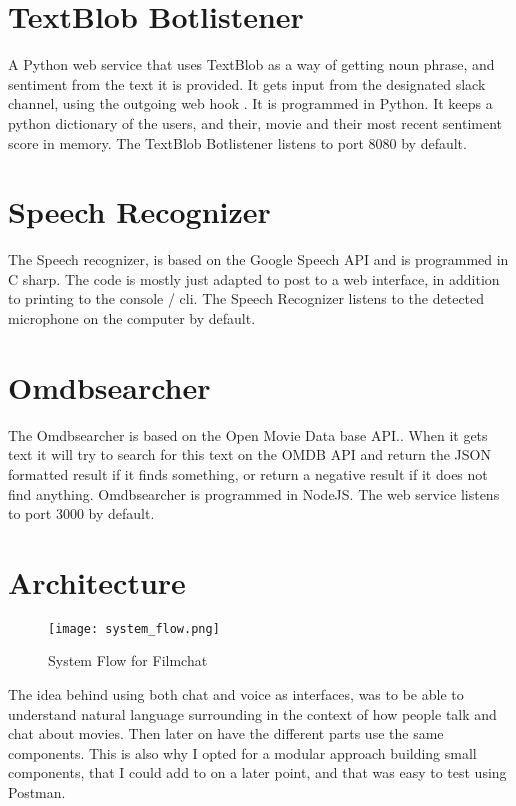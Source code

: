 \documentclass[11pt,fleqn]{book} %
\begin{document}
\section{TextBlob Botlistener}
A Python web service that uses TextBlob\cite{TextBlobTutorial:Documentation} as a way of getting noun phrase\cite{WikipediaNounPhrase}, and sentiment\cite{WikipediaSentimentAnalysis} from the text it is provided. It gets input from the designated slack channel, using the outgoing web hook \cite{SlackOutgoingSlack}. It is programmed in Python. It keeps a python dictionary of the users, and their, movie and their most recent sentiment score in memory. The TextBlob Botlistener listens to port 8080 by default.

\section{Speech Recognizer}
The Speech recognizer, is based on the Google Speech API \cite{GoogleCloudPlatformSpeechPlatform} and is programmed in C sharp. The code is mostly just adapted to post to a web interface, in addition to printing to the console / cli. The Speech Recognizer listens to the detected microphone on the computer by default. 

\section{Omdbsearcher}
The Omdbsearcher is based on the Open Movie Data base API.\cite{OMDbDatabase}. When it gets text it will try to search for this text on the OMDB API and return the JSON formatted result if it finds something, or return a negative result if it does not find anything. Omdbsearcher is programmed in NodeJS. The web service listens to port 3000 by default.

\newpage
\section{Architecture}
\begin{figure}[]
  \centering
   \texttt{[image: system\_flow.png]}
  \caption{System Flow for Filmchat}
  \label{fig:system_flow}
\end{figure}
The idea behind using both chat and voice as interfaces, was to be able to understand natural language surrounding in the context of how people talk and chat about movies. Then later on have the different parts use the same components. This is also why I opted for a modular approach building small components, that I could add to on a later point, and that was easy to test using Postman.
\end{document}
